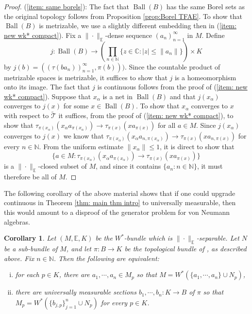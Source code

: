 \documentclass[10pt]{amsart}
\newtheorem{cor}[thm]{Corollary}
\theoremstyle{definition}
\numberwithin{equation}{section}
\newcommand{\bC}{{\mathbb C}}
\newcommand{\bE}{{\mathbb E}}
\newcommand{\bN}{{\mathbb N}}
\newcommand{\cT}{{\mathcal T}}
\DeclareMathOperator{\Ball}{Ball}
\begin{document}
\begin{proof}
(\ref{item: same borels}): The fact that $\Ball(B)$ has the same Borel sets as the original topology follows from Proposition \ref{prop:Borel TFAE}.
To show that $\Ball(B)$ is metrizable, we use a slightly different embedding then in (\ref{item: new wk* compact}). Fix a $\|\cdot\|_{\bE}$-dense sequence $(a_{n})_{n=1}^{\infty}$ in $M$. Define 
\[j\colon \Ball(B)\to \left(\prod_{n\in \bN}\{z\in \bC:|z|\leq \|a_{n}\|\}\right)\times K\]
by $j(b)=((\tau(ba_{n}))_{n=1}^{\infty},\pi(b)))$.
Since the countable product of metrizable spaces is metrizable, it suffices to show that $j$ is a homeomorphism onto its image. The fact that $j$ is continuous follows from the proof of (\ref{item: new wk* compact}). 
Suppose that $x_{\alpha}$ is a net in $\Ball(B)$ and that $j(x_{\alpha})$ converges to $j(x)$ for some $x\in\Ball(B)$. To show that $x_{\alpha}$ converges to $x$ with respect to $\widetilde{\cT}$ it suffices, from the proof of (\ref{item: new wk* compact}), to show that $\tau_{\pi(x_{\alpha})}(x_{\alpha}a_{\pi(x_{\alpha})})\to \tau_{\pi(x)}(xa_{\pi(x)})$ for all $a\in M$. Since $j(x_{\alpha})$ converges to $j(x)$ we know that 
$\tau_{\pi(x_{\alpha})}(x_{\alpha}a_{n,\pi(x_{\alpha})})\to \tau_{\pi(x)}(xa_{n,\pi(x)})$ for every $n\in \bN$. From the uniform estimate $\|x_{\alpha}\|\leq 1$, it is direct to show that 
\[\{a\in M:\tau_{\pi(x_{\alpha})}(x_{\alpha}a_{\pi(x_{\alpha})})\to \tau_{\pi(x)}(xa_{\pi(x)})\} \]
is a $\|\cdot\|_{\bE}$-closed subset of $M$, and since it contains $\{a_{n}:n\in \bN\}$, it must therefore be all of $M$. 

 

 
 
 \end{proof}







The following corollary of the above material shows that if one could upgrade continuous in Theorem \ref{thm: main thm intro} to universally measurable, then this would amount to a disproof of the generator problem for von Neumann algebras. 
\begin{cor}
Let $(M,\bE,K)$ be the $W^{*}$-bundle which is $\|\cdot\|_{\bE}$-separable. Let $N$ be a sub-bundle of $M$, and let $\pi\colon B\to K$ be the topological bundle of \cite{EPBundles}, as described above. Fix $n\in \bN$. Then the following are equivalent:
\begin{enumerate}[(i)]
    \item for each $p\in K$, there are $a_{1},\cdots,a_{n}\in M_{p}$ so that $M=W^{*}(\{a_{1},\cdots,a_{n}\}\cup N_{p})$, \label{cor item: fiberwise finite generation over N iff}
    \item there are universally measurable sections $b_{1},\cdots,b_{n}\colon K\to B$ of $\pi$  so that $M_{p}=W^{*}(\{b_{j,p}\}_{j=1}^{n}\cup N_{p})$ for every $p\in K$. \label{cor item: finite generation univ measu}
\end{enumerate}
\end{cor}
\end{document}
